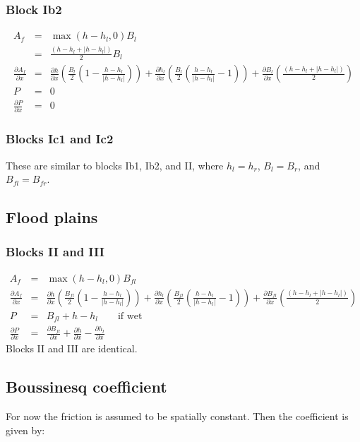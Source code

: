 \documentclass[a4paper, 11pt]{article}
\newcommand{\pa}[2]{\ensuremath{\frac{\partial #1}{\partial #2}}}
\begin{document}
\subsubsection{Block Ib2}
\begin{eqnarray}
\nonumber
A_f &=& \max(h-h_l,0)B_l\\
\nonumber
&=& \frac{(h-h_l + |h-h_l|)}{2} B_l\\
\nonumber
\pa{A_f}{x} &=& \pa{h}{x} \left(\frac{B_l}{2}\left(1-\frac{h-h_l}{|h-h_l|}\right)\right)+  \pa{h_l}{x} \left(\frac{B_l}{2}\left(\frac{h-h_l}{|h-h_l|}-1\right)\right)+ \pa{B_l}{x}\left( \frac{(h-h_l + |h-h_l|)}{2}\right)\\
\nonumber
P&=& 0\\
\nonumber
\pa{P}{x} &=& 0
\end{eqnarray}

\subsubsection{Blocks Ic1 and Ic2}
These are similar to blocks Ib1, Ib2, and II, where $h_l=h_r$, $B_l=B_r$, and $B_{fl}=B_{fr}$.

\subsection{Flood plains}
\subsubsection{Blocks II and III}
\begin{eqnarray}
\nonumber
A_f &=&  \max(h-h_l,0)B_{fl}\\
\nonumber
\pa{A_f}{x} &=& \pa{h}{x} \left(\frac{B_{fl}}{2}\left(1-\frac{h-h_l}{|h-h_l|}\right)\right)+  \pa{h_l}{x} \left(\frac{B_{fl}}{2}\left(\frac{h-h_l}{|h-h_l|}-1\right)\right)+ \pa{B_{fl}}{x}\left( \frac{(h-h_l + |h-h_l|)}{2}\right)\\
\nonumber
P &=& B_{fl}+ h-h_l \qquad \text{if wet}\\
\nonumber
\pa{P}{x} &=&  \pa{B_{fl}}{x}+ \pa{h}{x}-\pa{h_l}{x}
\end{eqnarray}
Blocks II and III are identical.


\subsection{Boussinesq coefficient}
For now the friction is assumed to be spatially constant. Then the coefficient is given by:
\end{document}
